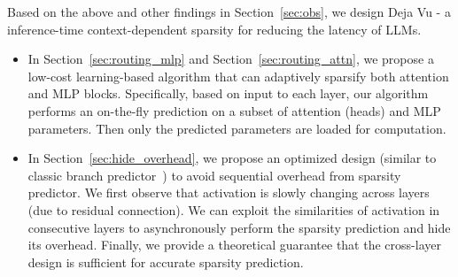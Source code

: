 
\iffalse
Based on the above and other findings in Section~\ref{sec:obs}, we design Deja Vu - a inference-time context-dependent sparsity for reducing the latency of LLMs.
\vspace{-2.5mm}
\begin{itemize}
    \item  In Section~\ref{sec:routing_mlp} and Section~\ref{sec:routing_attn}, we propose a low-cost learning-based algorithm that can adaptively sparsify both attention and MLP blocks. Specifically, based on input to each layer,  our algorithm performs an on-the-fly prediction on a subset of attention (heads) and MLP parameters. Then only the predicted parameters are loaded for computation.

    

    \item  In Section~\ref{sec:hide_overhead}, we propose an optimized design (similar to classic branch predictor~\cite{smith1998study}) to avoid sequential overhead from sparsity predictor. We first observe that activation is slowly changing across layers (due to residual connection). We can exploit the similarities of activation in consecutive layers to asynchronously perform the sparsity prediction and hide its overhead. Finally, we provide a theoretical guarantee that the cross-layer design is sufficient for accurate sparsity prediction. 
    


\end{itemize}
